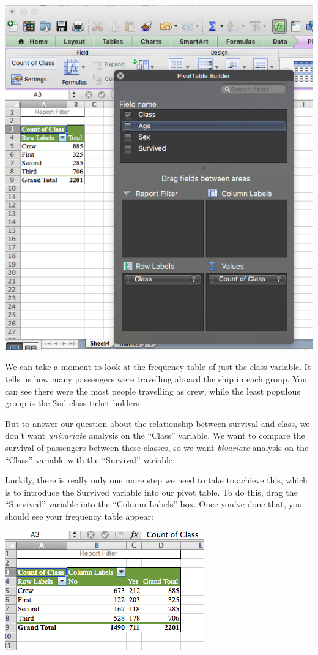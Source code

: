 \documentclass[]{book}
\theoremstyle{definition}
\theoremstyle{definition}
\theoremstyle{definition}
\theoremstyle{remark}
\begin{document}
\includegraphics{imgs/class_uni.png}

We can take a moment to look at the frequency table of just the class
variable. It tells us how many passengers were travelling aboard the
ship in each group. You can see there were the most people travelling as
crew, while the least populous group is the 2nd class ticket holders.

But to answer our question about the relationship between survival and
class, we don't want \emph{univariate} analysis on the ``Class''
variable. We want to compare the survival of passengers between these
classes, so we want \emph{bivariate} analysis on the ``Class'' variable
with the ``Survival'' variable.

Luckily, there is really only one more step we need to take to achieve
this, which is to introduce the Survived variable into our pivot table.
To do this, drag the ``Survived'' variable into the ``Column Labels''
box. Once you've done that, you should see your frequency table appear:

\includegraphics{imgs/crosstabl_pivot.png}
\end{document}
